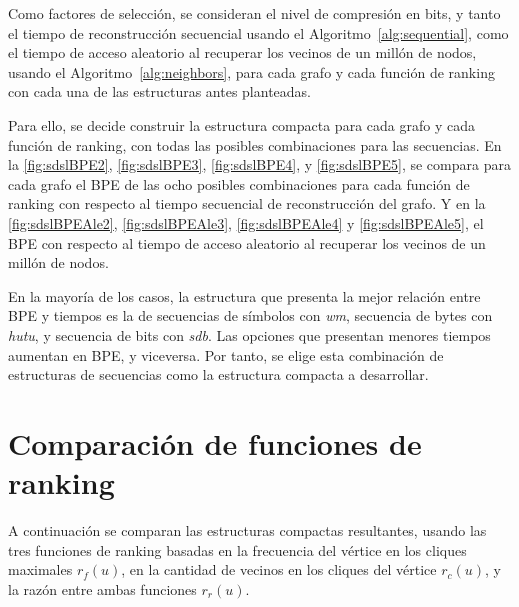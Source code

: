 Como factores de selección, se consideran el nivel de compresión en bits, y tanto el tiempo de reconstrucción secuencial usando el Algoritmo~\ref{alg:sequential}, como el tiempo de acceso aleatorio al recuperar los vecinos de un millón de nodos, usando el Algoritmo~\ref{alg:neighbors}, para cada grafo y cada función de ranking con cada una de las estructuras antes planteadas.


Para ello, se decide construir la estructura compacta para cada grafo y cada función de ranking, con todas las posibles combinaciones para las secuencias. En la \autoref{fig:sdslBPE2}, \autoref{fig:sdslBPE3}, \autoref{fig:sdslBPE4}, y \autoref{fig:sdslBPE5}, se compara para cada grafo el BPE de las ocho posibles combinaciones para cada función de ranking con respecto al tiempo secuencial de reconstrucción del grafo. Y en la \autoref{fig:sdslBPEAle2}, \autoref{fig:sdslBPEAle3}, \autoref{fig:sdslBPEAle4} y \autoref{fig:sdslBPEAle5}, el BPE con respecto al tiempo de acceso aleatorio al recuperar los vecinos de un millón de nodos.


En la mayoría de los casos, la estructura que presenta la mejor relación entre BPE y tiempos es la de secuencias de símbolos con \textit{wm}, secuencia de bytes con \textit{hutu}, y secuencia de bits con \textit{sdb}.  Las opciones que presentan menores tiempos aumentan en BPE, y viceversa. Por tanto, se elige esta combinación de estructuras de secuencias como la estructura compacta a desarrollar.











\section{Comparación de funciones de ranking}

A continuación se comparan las estructuras compactas resultantes, usando las tres funciones de ranking basadas en la frecuencia del vértice en los cliques maximales $r_{f}(u)$, en la cantidad de vecinos en los cliques del vértice $r_{c}(u)$, y la razón entre ambas funciones $r_{r}(u)$. 

